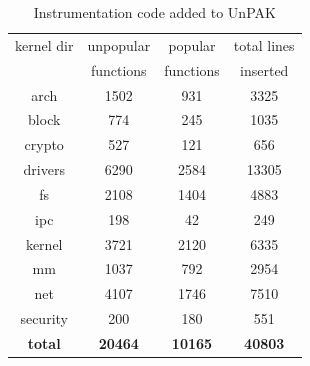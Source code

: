 \begin{table}
\caption{Instrumentation code added to UnPAK}
\label{tab:kernel_instrumentation}
\begin{tabular}{c|c|c|c}
 kernel dir & unpopular & popular & total lines \\
 & functions & functions & inserted \\
 \hline
 arch & 1502 & 931 & 3325 \\
 \hline
 block & 774 & 245 & 1035 \\
 \hline
 crypto & 527 & 121 & 656 \\ 
 \hline
 drivers & 6290 & 2584 & 13305 \\
 \hline
 fs & 2108 & 1404 & 4883 \\
 \hline
 ipc & 198 & 42 & 249 \\
 \hline
 kernel & 3721 & 2120 & 6335 \\
 \hline
 mm & 1037 & 792 & 2954 \\
 \hline
 net & 4107 & 1746 & 7510 \\
 \hline
 security & 200 & 180 & 551 \\
 \hline
 \textbf{total} & \textbf{20464} & \textbf{10165} & \textbf{40803} \\
\end{tabular}
\end{table}

